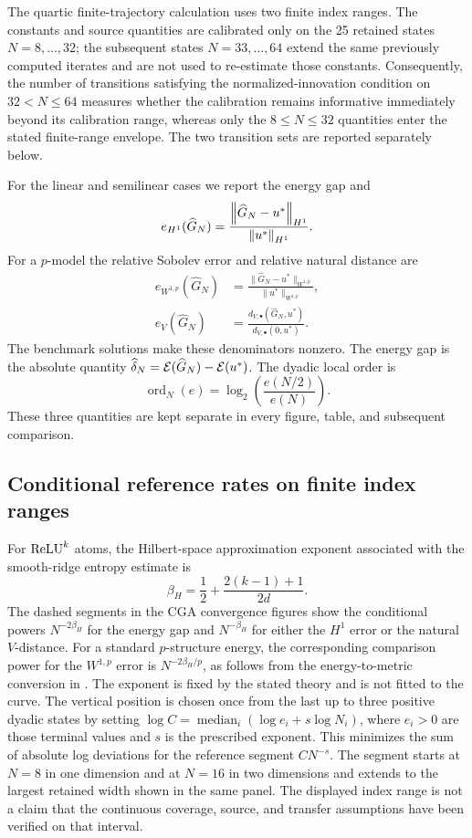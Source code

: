 The quartic finite-trajectory calculation uses two finite index ranges. The constants
and source quantities are calibrated only on the 25 retained states
$N=8,\ldots,32$; the subsequent states $N=33,\ldots,64$ extend the same previously
computed iterates and are not used to re-estimate those constants. Consequently, the
number of transitions satisfying the normalized-innovation condition on
$32<N\le64$ measures whether the calibration remains informative immediately beyond
its calibration range, whereas only the $8\le N\le32$ quantities enter the stated
finite-range envelope. The two transition sets are reported separately below.

For the linear and semilinear cases we report the energy gap and
\[
 e_{H^1}(\widehat G_N)=\frac{\left\lVert \widehat G_N-u^*\right\rVert_{H^1}}{\left\lVert u^*\right\rVert_{H^1}}.
\]
For a \(p\)-model the relative Sobolev error and relative natural distance are
\begin{align*}
 e_{W^{1,p}}(\widehat G_N)&=\frac{\|\widehat G_N-u^*\|_{W^{1,p}}}{\|u^*\|_{W^{1,p}}},\\
 e_V(\widehat G_N)&=\frac{d_{V,\bullet}(\widehat G_N,u^*)}{d_{V,\bullet}(0,u^*)}.
\end{align*}
The benchmark solutions make these denominators nonzero. The energy gap is the absolute quantity
\(\widehat\delta_N=\mathcal{E}(\widehat G_N)-\mathcal{E}(u^*)\).
The dyadic local order is
\[
 \operatorname{ord}_N(e)=\log_2\!\left(\frac{e(N/2)}{e(N)}\right).
\]
These three quantities are kept separate in every figure, table, and subsequent comparison.

\subsection{Conditional reference rates on finite index ranges}

For \(\operatorname{ReLU}^k\) atoms, the Hilbert-space approximation exponent associated with the smooth-ridge
entropy estimate is
\[
 \beta_H=\frac12+\frac{2(k-1)+1}{2d}.
\]
The dashed segments in the CGA convergence figures show the conditional powers \(N^{-2\beta_H}\) for
the energy gap and \(N^{-\beta_H}\) for either the \(H^1\) error or the natural \(V\)-distance. For a
standard \(p\)-structure energy, the corresponding comparison power for the \(W^{1,p}\) error is
\(N^{-2\beta_H/p}\), as follows from the energy-to-metric conversion in
. The exponent is fixed by the stated theory and is not fitted to the curve.
The vertical position is chosen once from the last up to three positive dyadic states by
setting \(\log C=\operatorname{median}_i(\log e_i+s\log N_i)\), where \(e_i>0\)
are those terminal values and \(s\) is the prescribed exponent. This minimizes the
sum of absolute log deviations for the reference segment \(CN^{-s}\). The segment starts at \(N=8\) in one dimension and at
\(N=16\) in two dimensions and extends to the largest retained width shown in the same panel. The
displayed index range is not a claim that the continuous coverage, source, and transfer assumptions have
been verified on that interval.

